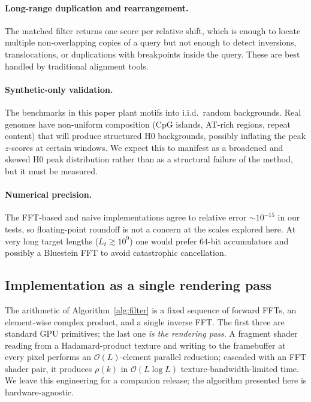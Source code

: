 \documentclass[twocolumn,11pt,a4paper]{article}
\theoremstyle{definition}
\theoremstyle{remark}
\newcommand{\bigO}{\mathcal{O}}
\begin{document}
\paragraph{Long-range duplication and rearrangement.} The matched filter
returns one score per relative shift, which is enough to locate
multiple non-overlapping copies of a query but not enough to detect
inversions, translocations, or duplications with breakpoints inside
the query. These are best handled by traditional alignment tools.

\paragraph{Synthetic-only validation.} The benchmarks in this paper
plant motifs into i.i.d.\ random backgrounds. Real genomes have
non-uniform composition (CpG islands, AT-rich regions, repeat content)
that will produce structured H0 backgrounds, possibly inflating the
peak $z$-scores at certain windows. We expect this to manifest as a
broadened and skewed H0 peak distribution rather than as a structural
failure of the method, but it must be measured.

\paragraph{Numerical precision.} The FFT-based and naive implementations
agree to relative error $\sim 10^{-15}$ in our tests, so floating-point
roundoff is not a concern at the scales explored here. At very long
target lengths ($L_t \gtrsim 10^9$) one would prefer $64$-bit accumulators
and possibly a Bluestein FFT to avoid catastrophic cancellation.

\subsection{Implementation as a single rendering pass}

The arithmetic of Algorithm~\ref{alg:filter} is a fixed sequence of
forward FFTs, an element-wise complex product, and a single inverse
FFT. The first three are standard GPU primitives; the last one
\emph{is the rendering pass}. A fragment shader reading from a
Hadamard-product texture and writing to the framebuffer at every
pixel performs an $\bigO(L)$-element parallel reduction; cascaded
with an FFT shader pair, it produces $\rho(k)$ in $\bigO(L \log L)$
texture-bandwidth-limited time. We leave this engineering for a
companion release; the algorithm presented here is hardware-agnostic.
\end{document}
